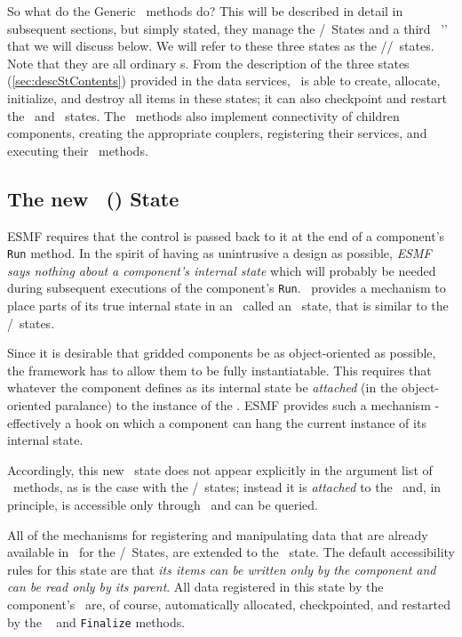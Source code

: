 So what do the Generic \IRF\ methods do? This will be described in detail
in subsequent sections, but simply stated, they manage the
\IM/\EX\ States and a third \stt\, '\gin'
that we will discuss below. We will refer to these three
states as the \IM/\EX/\gIN\ states. Note that they are all ordinary \stt s.
From the description of the three states (\ref{sec:descStContents})
provided in the data services, \ggn\  is able to create, allocate,
initialize, and destroy all items in these states; it can also
checkpoint and restart the \gin\ and \im\ states. The \IRF\ methods also
implement connectivity of children components, creating the appropriate
couplers, registering their services, and executing their \IRF\ methods.


\subsection{The new \gin\ (\gIN) State}

ESMF requires that the control
is passed back to it at the end of a component's \texttt{Run} method.
In the spirit of having as unintrusive a design as possible,
\emph{ESMF says nothing about a component's internal state} which will
probably be needed during subsequent executions of the component's
\texttt{Run}. \ggn\ provides a mechanism to place parts of its true
internal state in an \stt\, called an \gin\ state, that is similar to the
\IM/\EX\ states.

Since it is desirable that gridded components be as
object-oriented as possible, the framework has to allow them to be fully
instantiatable. This requires that whatever the component defines as
its internal state be \emph{attached} (in the object-oriented paralance)
to the instance of the \egc. ESMF provides such a mechanism - effectively a hook
on which a component can hang the current instance of its internal state.

Accordingly, this new \gIN\ state does not appear explicitly in the argument
list of \IRF\ methods, as is the case with the \IM/\EX\ states; instead
it is \emph{attached} to the \egc\  and, in principle, is accessible only
through \ggn\ and can be queried.

All of the mechanisms for registering and manipulating data that are
already available in \ggn\  for the \IM/\EX\ States, are
extended to the \gIN\ state. The default accessibility rules
for this state are that \emph{its items can be written only by the component
and can be read only by its parent}. All data registered in this state
by the component's \ssv\  are, of course, automatically
allocated, checkpointed, and restarted by the \ggn\ 
and \texttt{Finalize} methods.


